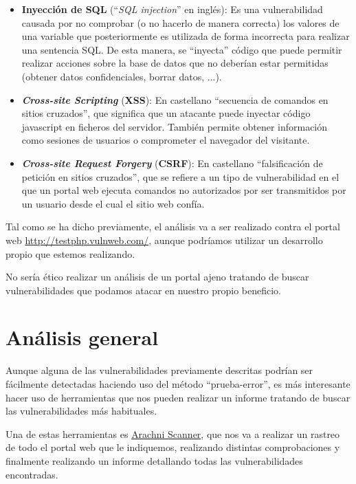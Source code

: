 \documentclass{\ClassPath/viu-tfm-template}
\begin{document}
\begin{itemize}
    \item \textbf{Inyección de SQL} (“\textit{SQL injection}” en inglés): Es una vulnerabilidad causada por no comprobar (o no hacerlo de  manera correcta) los valores de una variable que posteriormente es utilizada de forma incorrecta para realizar una sentencia SQL. De esta manera, se “inyecta” código que puede permitir realizar acciones sobre la base de datos que no deberían estar permitidas (obtener datos confidenciales, borrar datos, ...).

    \item \textbf{\textit{Cross-site Scripting}} (\textbf{XSS}): En castellano “secuencia de comandos en sitios cruzados”, que significa que un atacante puede inyectar código javascript en ficheros del servidor. También permite obtener información como sesiones de usuarios o comprometer el navegador del visitante.

    \item \textbf{\textit{Cross-site Request Forgery}} (\textbf{CSRF}): En castellano “falsificación de petición en sitios cruzados”, que se refiere a un tipo de  vulnerabilidad en el que un portal web ejecuta comandos no autorizados por ser transmitidos por un usuario desde el cual el sitio web confía.
\end{itemize}

Tal como se ha dicho previamente, el análisis va a ser realizado contra el portal web \href{http://testphp.vulnweb.com/}{http://testphp.vulnweb.com/}, aunque podríamos utilizar un desarrollo propio que estemos realizando.

No sería ético realizar un análisis de un portal ajeno tratando de buscar vulnerabilidades que podamos atacar en nuestro propio beneficio.


\chapter{Análisis general}

Aunque alguna de las vulnerabilidades previamente descritas podrían ser fácilmente detectadas haciendo uso del método “prueba-error”, es más interesante hacer uso de herramientas que nos pueden realizar un informe tratando de buscar las vulnerabilidades más habituales.

Una de estas herramientas es \href{https://www.arachni-scanner.com/}{Arachni Scanner}, que nos va a realizar un rastreo de todo el portal web que le indiquemos, realizando distintas comprobaciones y finalmente realizando un informe detallando todas las vulnerabilidades encontradas.
\end{document}
